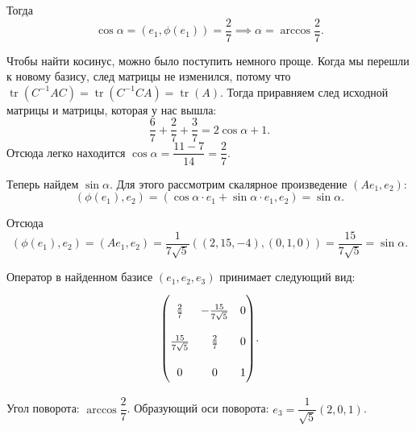 \documentclass[a4paper]{article}
\newcommand{\tr}{\operatorname{tr}}
\begin{document}
\begin{enumerate}
\begin{solution}
            Тогда
            \begin{equation*}
                \cos \alpha = (e_1, \phi(e_1)) = \dfrac{2}{7} \implies \alpha = \arccos \dfrac{2}{7}.
            \end{equation*}

            Чтобы найти косинус, можно было поступить немного проще. Когда мы перешли к новому базису, след матрицы не изменился, потому что $\tr(C^{-1}AC) = \tr(C^{-1}CA) = \tr(A)$. Тогда приравняем след исходной матрицы и матрицы, которая у нас вышла:
            \begin{equation*}
                \dfrac{6}{7} + \dfrac{2}{7} + \dfrac{3}{7} = 2 \cos \alpha + 1.
            \end{equation*}
            Отсюда легко находится $\cos \alpha = \dfrac{11 - 7}{14} = \dfrac{2}{7}$.

            Теперь найдем $\sin \alpha$. Для этого рассмотрим скалярное произведение $(Ae_1, e_2)$:
            \begin{equation*}
                (\phi(e_1), e_2) = (\cos \alpha \cdot e_1 + \sin \alpha \cdot e_1, e_2) = \sin \alpha.
            \end{equation*}

            Отсюда
            \begin{equation*}
                (\phi(e_1), e_2) = (Ae_1, e_2) = \dfrac{1}{7 \sqrt{5}} ((2, 15, -4), (0, 1, 0)) = \dfrac{15}{7 \sqrt{5}} = \sin \alpha.
            \end{equation*}

            Оператор в найденном базисе $(e_1, e_2, e_3)$ принимает следующий вид:
            \begin{equation*}
                {\renewcommand{\arraystretch}{2.3}\begin{pmatrix}
                    \frac{2}{7} & -\frac{15}{7 \sqrt{5}} & 0 \\
                    \frac{15}{7 \sqrt{5}} & \frac{2}{7} & 0 \\
                    0 & 0 & 1 \\
                \end{pmatrix}}.
            \end{equation*}

            Угол поворота: $\arccos \dfrac{2}{7}$. Образующий оси поворота: $e_3 = \dfrac{1}{\sqrt{5}}(2, 0, 1)$.
        \end{solution}
    \end{enumerate}
\end{document}
